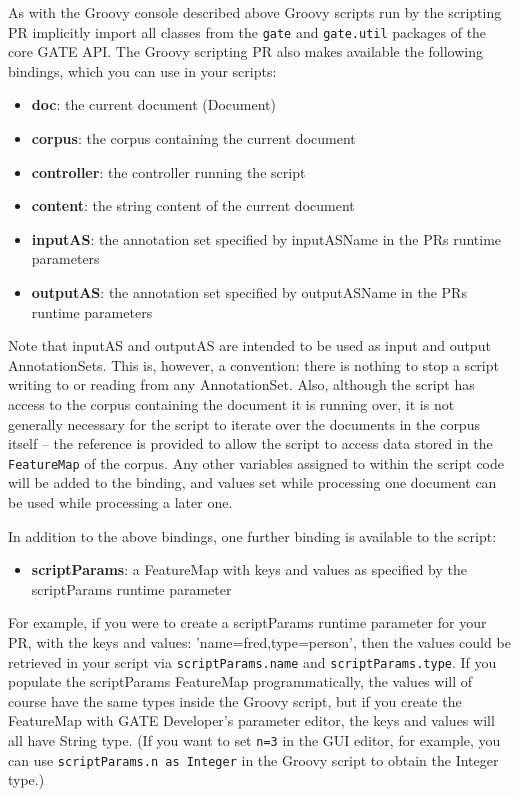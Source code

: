 As with the Groovy console described above Groovy scripts run by the scripting PR
implicitly import all classes from the \verb|gate| and \verb|gate.util| packages
of the core GATE API. The Groovy scripting
PR also makes available the following bindings, which you can use in your
scripts:

\begin{itemize}
\item \textbf{doc}: the current document (Document)
\item \textbf{corpus}: the corpus containing the current document 
\item \textbf{controller}: the controller running the script
\item \textbf{content}: the string content of the current document
\item \textbf{inputAS}: the annotation set specified by inputASName in the PRs
  runtime parameters
\item \textbf{outputAS}: the annotation set specified by outputASName in the PRs
  runtime parameters
\end{itemize}

Note that inputAS and outputAS are intended to be used as input and output
AnnotationSets. This is, however, a convention: there is nothing to stop a
script writing to or reading from any AnnotationSet.  Also, although the script
has access to the corpus containing the document it is running over, it is not
generally necessary for the script to iterate over the documents in the corpus
itself -- the reference is provided to allow the script to access data stored
in the {\tt FeatureMap} of the corpus.  Any other variables assigned to within
the script code will be added to the binding, and values set while processing
one document can be used while processing a later one.


In addition to the above bindings, one further binding is available to the
script:

\begin{itemize}
\item \textbf{scriptParams}: a FeatureMap with keys and values as specified by
  the scriptParams runtime parameter
\end{itemize}

For example, if you were to create a scriptParams runtime parameter for your PR,
with the keys and values: 'name=fred,type=person', then the values could be
retrieved in your script via \texttt{scriptParams.name} and
\texttt{scriptParams.type}.  If you populate the scriptParams FeatureMap
programmatically, the values will of course have the same types inside the
Groovy script, but if you create the FeatureMap with GATE Developer's parameter
editor, the keys and values will all have String type.  (If you want to set
\texttt{n=3} in the GUI editor, for example, you can use \texttt{scriptParams.n
  as Integer} in the Groovy script to obtain the Integer type.)


